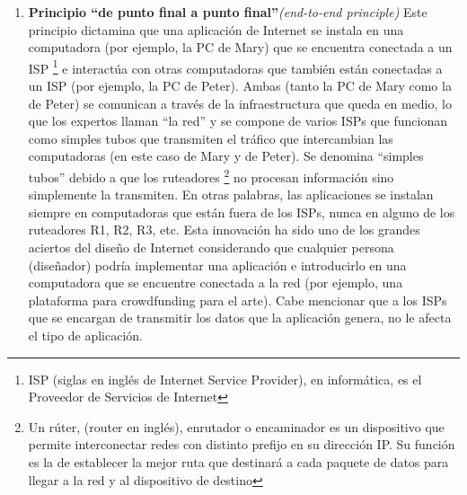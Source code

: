 \documentclass[12pt]{report} %
\begin{document}
\begin{enumerate}
  \item{\textbf{Principio “de punto final a punto final”}\textit{(end-to-end principle)}}  Este principio dictamina que una aplicación de Internet se instala en una computadora (por ejemplo, la PC de Mary) que se encuentra conectada a un ISP \footnote{ISP (siglas en inglés de Internet Service Provider), en informática, es el Proveedor de Servicios de Internet}  e interactúa con otras computadoras que también están conectadas a un ISP (por ejemplo, la PC de Peter). Ambas (tanto la PC de Mary como la de Peter) se comunican a través de la infraestructura que queda en medio, lo que los expertos llaman “la red” y se compone de varios ISPs que funcionan como simples tubos que transmiten el tráfico que intercambian las computadoras (en este caso de Mary y de Peter). Se denomina “simples tubos” debido a que los ruteadores \footnote{Un rúter, (router en inglés),  enrutador o encaminador es un dispositivo que permite interconectar redes con distinto prefijo en su dirección IP. Su función es la de establecer la mejor ruta que destinará a cada paquete de datos para llegar a la red y al dispositivo de destino}  no procesan información sino simplemente la transmiten.  En otras palabras, las aplicaciones se instalan siempre en computadoras que están fuera de los ISPs, nunca en alguno de los ruteadores R1, R2, R3, etc. Esta innovación ha sido uno de los grandes aciertos del diseño de Internet considerando que cualquier persona (diseñador) podría implementar una aplicación e introducirlo en una computadora que se encuentre conectada a la red (por ejemplo, una plataforma para crowdfunding para el arte). Cabe mencionar que a los ISPs que se encargan de transmitir los datos que la aplicación genera, no le afecta el tipo de aplicación.


\end{enumerate}
\end{document}
